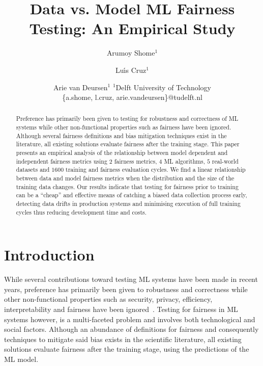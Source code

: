\documentclass{article}
\title{Data vs. Model ML Fairness Testing: An Empirical Study}
\author{
  Arumoy Shome$^1$
  \and
  Lu{\'\i}s Cruz$^1$\and
  Arie van Deursen$^{1}$
  \affiliations
  $^1$Delft University of Technology\\
  \emails
  \{a.shome, l.cruz, arie.vandeursen\}@tudelft.nl
}
\begin{document}
\maketitle

\begin{abstract}

  Preference has primarily been given to testing for robustness and
  correctness of ML systems while other non-functional properties such
  as fairness have been ignored. Although several fairness definitions
  and bias mitigation techniques exist in the literature, all existing
  solutions evaluate fairness after the training stage. This paper
  presents an empirical analysis of the relationship between model
  dependent and independent fairness metrics using $2$ fairness
  metrics, $4$ ML algorithms, $5$ real-world datasets and $1600$
  training and fairness evaluation cycles. We find a linear
  relationship between data and model fairness metrics when the
  distribution and the size of the training data changes. Our results
  indicate that testing for fairness prior to training can be a
  ``cheap'' and effective means of catching a biased data collection
  process early, detecting data drifts in production systems and
  minimising execution of full training cycles thus reducing
  development time and costs.

\end{abstract}

\section{Introduction}\label{sec:intro}




While several contributions toward testing ML systems have been made
in recent years, preference has primarily been given to robustness and
correctness while other non-functional properties such as security,
privacy, efficiency, interpretability and fairness have been
ignored \cite{zhang2020machine,zhang2021ignorance,mehrabi2021survey,wan2021modeling}. Testing
for fairness in ML systems however, is a multi-faceted problem and
involves both technological and social factors. Although an abundance
of definitions for fairness and consequently techniques to mitigate
said bias exists in the scientific literature, all existing solutions
evaluate fairness after the training stage, using the predictions of
the ML model.
\end{document}

